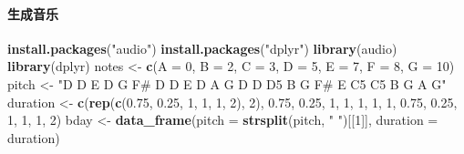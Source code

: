 \documentclass[
  twoside]{book}
\newenvironment{Shaded}{\begin{snugshade}}{\end{snugshade}}
\newcommand{\AttributeTok}[1]{\textcolor[rgb]{0.13,0.29,0.53}{#1}}
\newcommand{\DecValTok}[1]{\textcolor[rgb]{0.00,0.00,0.81}{#1}}
\newcommand{\FloatTok}[1]{\textcolor[rgb]{0.00,0.00,0.81}{#1}}
\newcommand{\FunctionTok}[1]{\textcolor[rgb]{0.13,0.29,0.53}{\textbf{#1}}}
\newcommand{\NormalTok}[1]{#1}
\newcommand{\OtherTok}[1]{\textcolor[rgb]{0.56,0.35,0.01}{#1}}
\newcommand{\StringTok}[1]{\textcolor[rgb]{0.31,0.60,0.02}{#1}}
\begin{document}
\hypertarget{ux751fux6210ux97f3ux4e50}{%
\paragraph{生成音乐}\label{ux751fux6210ux97f3ux4e50}}

\begin{Shaded}
\begin{Highlighting}[]
\FunctionTok{install.packages}\NormalTok{(}\StringTok{"audio"}\NormalTok{)}
\FunctionTok{install.packages}\NormalTok{(}\StringTok{"dplyr"}\NormalTok{)}
\FunctionTok{library}\NormalTok{(audio)}
\FunctionTok{library}\NormalTok{(dplyr)}
\NormalTok{notes }\OtherTok{\textless{}{-}} \FunctionTok{c}\NormalTok{(}\AttributeTok{A =} \DecValTok{0}\NormalTok{, }\AttributeTok{B =} \DecValTok{2}\NormalTok{, }\AttributeTok{C =} \DecValTok{3}\NormalTok{, }\AttributeTok{D =} \DecValTok{5}\NormalTok{, }\AttributeTok{E =} \DecValTok{7}\NormalTok{, }\AttributeTok{F =} \DecValTok{8}\NormalTok{, }\AttributeTok{G =} \DecValTok{10}\NormalTok{)}
\NormalTok{pitch }\OtherTok{\textless{}{-}} \StringTok{"D D E D G F\# D D E D A G D D D5 B G F\# E C5 C5 B G A G"}
\NormalTok{duration }\OtherTok{\textless{}{-}} \FunctionTok{c}\NormalTok{(}\FunctionTok{rep}\NormalTok{(}\FunctionTok{c}\NormalTok{(}\FloatTok{0.75}\NormalTok{, }\FloatTok{0.25}\NormalTok{, }\DecValTok{1}\NormalTok{, }\DecValTok{1}\NormalTok{, }\DecValTok{1}\NormalTok{, }\DecValTok{2}\NormalTok{), }\DecValTok{2}\NormalTok{),}
              \FloatTok{0.75}\NormalTok{, }\FloatTok{0.25}\NormalTok{, }\DecValTok{1}\NormalTok{, }\DecValTok{1}\NormalTok{, }\DecValTok{1}\NormalTok{, }\DecValTok{1}\NormalTok{, }\DecValTok{1}\NormalTok{, }\FloatTok{0.75}\NormalTok{, }\FloatTok{0.25}\NormalTok{, }\DecValTok{1}\NormalTok{, }\DecValTok{1}\NormalTok{, }\DecValTok{1}\NormalTok{, }\DecValTok{2}\NormalTok{)}
\NormalTok{bday }\OtherTok{\textless{}{-}} \FunctionTok{data\_frame}\NormalTok{(}\AttributeTok{pitch =} \FunctionTok{strsplit}\NormalTok{(pitch, }\StringTok{" "}\NormalTok{)[[}\DecValTok{1}\NormalTok{]],}
                   \AttributeTok{duration =}\NormalTok{ duration)}


\end{Highlighting}
\end{Shaded}
\end{document}
